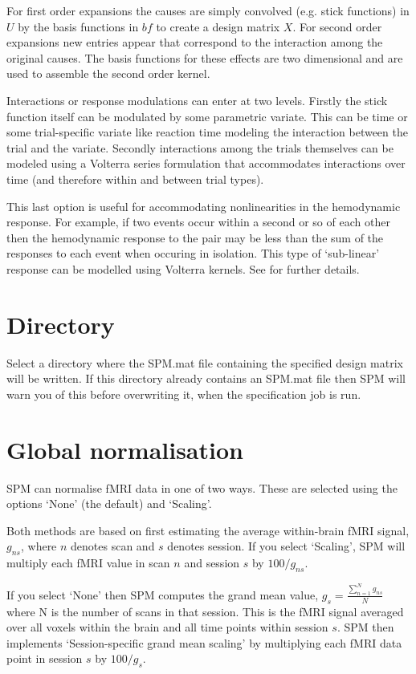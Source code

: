 For first order expansions the causes are simply convolved (e.g. stick functions) in $U$ by the basis functions in $bf$ to create a design matrix $X$.  For second order expansions new entries appear that correspond to the interaction among the original causes. The basis functions for these effects are two dimensional and are used to assemble the second order kernel. 

Interactions or response modulations can enter at two levels.  Firstly the stick function itself can be modulated by some parametric variate. This can be time or some trial-specific variate like reaction time modeling the interaction between the trial and the variate. Secondly interactions among the trials themselves can be modeled using a Volterra series formulation that accommodates interactions over time (and therefore within and between trial types). 

This last option is useful for accommodating nonlinearities in the hemodynamic response. For example, if two events occur within a second or so of each other then the hemodynamic response to the pair may be less than the sum of the responses to each event when occuring in isolation. This type of `sub-linear' response can be modelled using Volterra kernels. See \cite{balloon} for further details.

\section{Directory}

Select a directory where the SPM.mat file containing the specified design matrix will be written. If this directory already contains an SPM.mat file then SPM will warn you of this before overwriting it, when the specification job is run.

\section{Global normalisation}

SPM can normalise fMRI data in one of two ways. These are selected using the options `None' (the default) and `Scaling'. 

Both methods are based on first estimating the average within-brain fMRI signal, $g_{ns}$, where $n$ denotes scan and $s$ denotes session. If you select `Scaling', SPM will multiply each fMRI value in scan $n$ and session $s$ by $100/g_{ns}$.

If you select `None' then SPM computes the grand mean value, $g_s=\frac{\sum_{n=1}^N g_{ns}}{N}$ where N is the number of scans in that session. This is the fMRI signal averaged over all voxels within the brain and all time points within session $s$. SPM then implements `Session-specific grand mean scaling' by multiplying each fMRI data point in session $s$ by $100/g_s$. 
 
